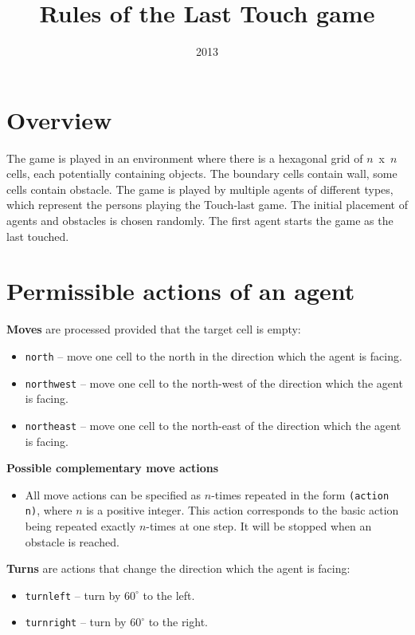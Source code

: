 \documentclass[a4paper,12pt]{article}
\title{Rules of the Last Touch game}
\author{}
\date{2013}
\begin{document}
\maketitle

\section*{Overview}

The game is played in an environment where there is a hexagonal grid of $n$~x~$n$ cells, each potentially containing
objects. The boundary cells contain wall, some cells contain obstacle. The game is
played by multiple agents of different types, which represent the persons playing the Touch-last game.
The initial placement of agents and obstacles is chosen randomly. The first agent starts the game as the last touched.

\section*{Permissible actions of an agent}

\textbf{Moves} are processed provided that the target cell is empty:

\begin{itemize}
\item \texttt{north} -- move one cell to the north in the direction which the agent is facing.
\item \texttt{northwest} -- move one cell to the  north-west of the direction which the agent is facing.
\item \texttt{northeast} -- move one cell to the north-east of the direction which the agent is facing.
\end{itemize}

\textbf{Possible complementary move actions}
\begin{itemize}
\item All move actions can be specified as $n$-times repeated in the form \texttt{(action n)}, where $n$ is a positive
integer. This action corresponds to the basic action being repeated exactly $n$-times at one step. It will be stopped
when an obstacle is reached.
\end{itemize}

\textbf{Turns} are actions that change the direction which the agent is facing:
\begin{itemize}
\item \texttt{turnleft} -- turn by $60^\circ$ to the left.
\item \texttt{turnright} -- turn by $60^\circ$ to the right.
\end{itemize}
\end{document}
